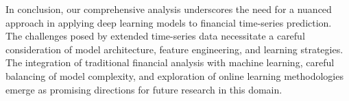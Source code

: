 \documentclass[10pt,twocolumn,letterpaper]{article}
\begin{document}
In conclusion, our comprehensive analysis underscores the need for a nuanced approach in applying deep learning models to financial time-series prediction. The challenges posed by extended time-series data necessitate a careful consideration of model architecture, feature engineering, and learning strategies. The integration of traditional financial analysis with machine learning, careful balancing of model complexity, and exploration of online learning methodologies emerge as promising directions for future research in this domain.


   {
      \small
      
      
   }





% 
\end{document}

